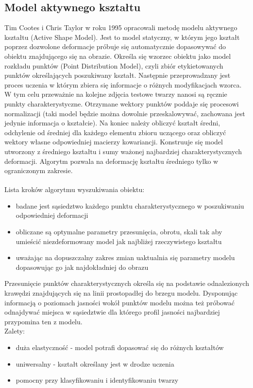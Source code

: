 \documentclass[11pt,a4paper]{article}
\begin{document}
\subsection{Model aktywnego kształtu}
Tim Cootes i Chris Taylor w roku 1995 opracowali metodę modelu aktywnego kształtu (Active Shape Model). Jest to model statyczny, w którym jego kształt poprzez dozwolone deformacje próbuje się automatycznie dopasowywać do obiektu znajdującego się na obrazie. Określa się wzorzec obiektu jako model rozkładu punktów (Point Distribution Model), czyli zbiór etykietowanych punktów określających poszukiwany kształt. Następnie przeprowadzany jest proces uczenia w którym zbiera się informacje o różnych modyfikacjach wzorca. W tym celu przeważnie na kolejne zdjęcia testowe twarzy nanosi są ręcznie punkty charakterystyczne. Otrzymane wektory punktów poddaje się procesowi normalizacji (taki model będzie można dowolnie przeskalowywać, zachowana jest jedynie informacja o kształcie). Na koniec należy obliczyć kształt średni, odchylenie od średniej dla każdego elementu zbioru uczącego oraz obliczyć wektory własne odpowiedniej macierzy kowariancji. Konstruuje się model utworzony z średniego kształtu i sumy ważonej najbardziej charakterystycznych deformacji. Algorytm pozwala na deformację kształtu średniego tylko w ograniczonym zakresie.\\
\\
\noindent
Lista kroków algorytmu wyszukiwania obiektu:
\begin{itemize}
\item badane jest sąsiedztwo każdego punktu charakterystycznego w poszukiwaniu odpowiedniej deformacji
\item obliczane są optymalne parametry przesunięcia, obrotu, skali tak aby umieścić niezdeformowany model jak najbliżej rzeczywistego kształtu
\item uważając na dopuszczalny zakres zmian uaktualnia się parametry modelu dopasowując go jak najdokładniej do obrazu
\end{itemize}

Przesunięcie punktów charakterystycznych określa się na podstawie odnalezionych krawędzi znajdujących się na linii prostopadłej do brzegu modelu. Dysponując informacją o poziomach jasności wokół punktów modelu można też próbować odnajdywać miejsca w sąsiedztwie dla którego profil jasności najbardziej przypomina ten z modelu. \\

\noindent 
Zalety:
\begin{itemize}
\item duża elastyczność - model potrafi dopasować się do różnych kształtów
\item uniwersalny - kształt określany jest w drodze uczenia
\item pomocny przy klasyfikowaniu i identyfikowaniu twarzy
\end{itemize}
\end{document}
